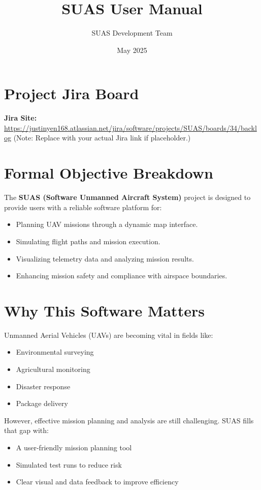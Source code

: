 \documentclass{article}
\title{SUAS User Manual}
\author{SUAS Development Team}
\date{May 2025}
\begin{document}
\maketitle
\vspace{1cm}
\tableofcontents
\newpage

\section{Project Jira Board}
\textbf{Jira Site:} \href{https://justinyen168.atlassian.net/jira/software/projects/SUAS/boards/34/backlog}{https://justinyen168.atlassian.net/jira/software/projects/SUAS/boards/34/backlog}
(Note: Replace with your actual Jira link if placeholder.)

\section{Formal Objective Breakdown}
The \textbf{SUAS (Software Unmanned Aircraft System)} project is designed to provide users with a reliable software platform for:
\begin{itemize}
    \item Planning UAV missions through a dynamic map interface.
    \item Simulating flight paths and mission execution.
    \item Visualizing telemetry data and analyzing mission results.
    \item Enhancing mission safety and compliance with airspace boundaries.
\end{itemize}

\section{Why This Software Matters}
Unmanned Aerial Vehicles (UAVs) are becoming vital in fields like:
\begin{itemize}
    \item Environmental surveying
    \item Agricultural monitoring
    \item Disaster response
    \item Package delivery
\end{itemize}

However, effective mission planning and analysis are still challenging. SUAS fills that gap with:
\begin{itemize}
    \item A user-friendly mission planning tool
    \item Simulated test runs to reduce risk
    \item Clear visual and data feedback to improve efficiency
\end{itemize}
\end{document}
